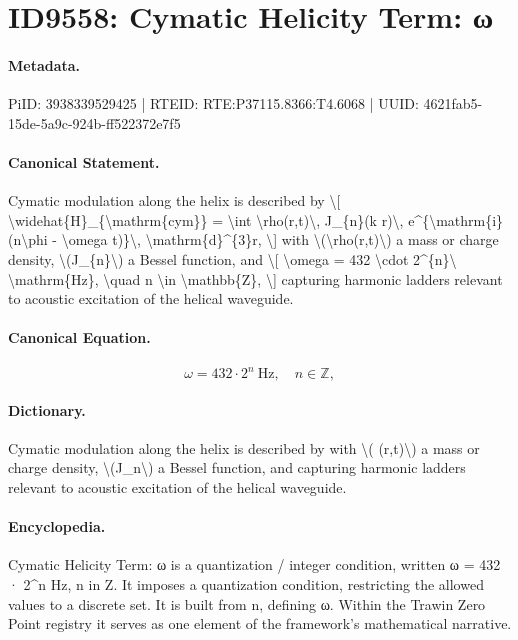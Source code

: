 \section*{ID9558: Cymatic Helicity Term: ω}
\paragraph{Metadata.}
PiID: 3938339529425 | RTEID: RTE:P37115.8366:T4.6068 | UUID: 4621fab5-15de-5a9c-924b-ff522372e7f5

\paragraph{Canonical Statement.}
Cymatic modulation along the helix is described by \textbackslash{}[ \textbackslash{}widehat\{H\}\_\{\textbackslash{}mathrm\{cym\}\} = \textbackslash{}int \textbackslash{}rho(r,t)\textbackslash{}, J\_\{n\}(k r)\textbackslash{}, e\textasciicircum{}\{\textbackslash{}mathrm\{i\} (n\textbackslash{}phi - \textbackslash{}omega t)\}\textbackslash{}, \textbackslash{}mathrm\{d\}\textasciicircum{}\{3\}r, \textbackslash{}] with \textbackslash{}(\textbackslash{}rho(r,t)\textbackslash{}) a mass or charge density, \textbackslash{}(J\_\{n\}\textbackslash{}) a Bessel function, and \textbackslash{}[ \textbackslash{}omega = 432 \textbackslash{}cdot 2\textasciicircum{}\{n\}\textbackslash{} \textbackslash{}mathrm\{Hz\}, \textbackslash{}quad n \textbackslash{}in \textbackslash{}mathbb\{Z\}, \textbackslash{}] capturing harmonic ladders relevant to acoustic excitation of the helical waveguide.

\paragraph{Canonical Equation.}
\[
\omega = 432 \cdot 2^{n}\ \mathrm{Hz}, \quad n \in \mathbb{Z},
\]

\paragraph{Dictionary.}
Cymatic modulation along the helix is described by with \textbackslash{}( (r,t)\textbackslash{}) a mass or charge density, \textbackslash{}(J\_n\textbackslash{}) a Bessel function, and capturing harmonic ladders relevant to acoustic excitation of the helical waveguide.

\paragraph{Encyclopedia.}
Cymatic Helicity Term: ω is a quantization / integer condition, written ω = 432 · 2\textasciicircum{}n Hz, n in Z. It imposes a quantization condition, restricting the allowed values to a discrete set. It is built from n, defining ω. Within the Trawin Zero Point registry it serves as one element of the framework's mathematical narrative.
